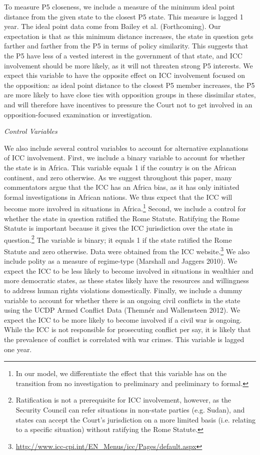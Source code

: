 To measure P5 closeness, we include a measure of the minimum ideal point distance from the given state to the closest P5 state. This measure is lagged 1 year. The ideal point data come from Bailey et al. (Forthcoming). Our expectation is that as this minimum distance increases, the state in question gets farther and farther from the P5 in terms of policy similarity. This suggests that the P5 have less of a vested interest in the government of that state, and ICC involvement should be more likely, as it will not threaten strong P5 interests. We expect this variable to have the opposite effect on ICC involvement focused on the opposition: as ideal point distance to the closest P5 member increases, the P5 are more likely to have close ties with opposition groups in these dissimilar states, and will therefore have incentives to pressure the Court not to get involved in an opposition-focused examination or investigation. 

\emph{Control Variables }

We also include several control variables to account for alternative explanations of ICC involvement. First, we include a binary variable to account for whether the state is in Africa. This variable equals 1 if the country is on the African continent, and zero otherwise. As we suggest throughout this paper, many commentators argue that the ICC has an Africa bias, as it has only initiated formal investigations in African nations. We thus expect that the ICC will become more involved in situations in Africa.\footnote{In our model, we differentiate the effect that this variable has on the transition from no investigation to preliminary and preliminary to formal.} Second, we include a control for whether the state in question ratified the Rome Statute. Ratifying the Rome Statute is important because it gives the ICC jurisdiction over the state in question.\footnote{Ratification is not a prerequisite for ICC involvement, however, as the Security Council can refer situations in non-state parties (e.g. Sudan), and states can accept the Court's jurisdiction on a more limited basis (i.e. relating to a specific situation) without ratifying the Rome Statute.} The variable is binary; it equals 1 if the state ratified the Rome Statute and zero otherwise. Data were obtained from the ICC website.\footnote{\url{http://www.icc-cpi.int/EN\_Menus/icc/Pages/default.aspx}} We also include polity as a measure of regime-type (Marshall and Jaggers 2010). We expect the ICC to be less likely to become involved in situations in wealthier and more democratic states, as these states likely have the resources and willingness to address human rights violations domestically. Finally, we include a dummy variable to account for whether there is an ongoing civil conflicts in the state using the UCDP Armed Conflict Data (Themnér and Wallensteen 2012). We expect the ICC to be more likely to become involved if a civil war is ongoing. While the ICC is not responsible for prosecuting conflict per say, it is likely that the prevalence of conflict is correlated with war crimes. This variable is lagged one year.
